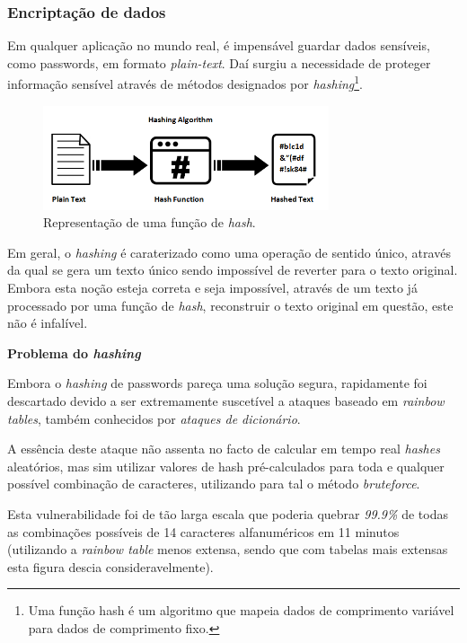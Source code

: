 \cleardoublepage
\subsubsection{Encriptação de dados}

Em qualquer aplicação no mundo real, é impensável guardar dados sensíveis, como passwords, em formato \emph{plain-text}. Daí surgiu a necessidade de proteger informação sensível através de métodos designados por \emph{hashing}\footnote{Uma função hash é um algoritmo que mapeia dados de comprimento variável para dados de comprimento fixo.}.\\

\begin{figure}[h]
    \centering
    \includegraphics[width=0.75\textwidth]{img/bcrypt/Hashing.png}
    \caption{Representação de uma função de \emph{hash}.}
\end{figure}

Em geral, o \emph{hashing} é caraterizado como uma operação de sentido único, através da qual se gera um texto único sendo impossível de reverter para o texto original.
Embora esta noção esteja correta e seja impossível, através de um texto já processado por uma função de \emph{hash}, reconstruir o texto original em questão, este não é infalível.

\vspace{0.5cm}
\large{\textbf{Problema do \emph{hashing}}}


Embora o \emph{hashing} de passwords pareça uma solução segura, rapidamente foi descartado devido a ser extremamente suscetível a ataques baseado em \emph{rainbow tables}, também conhecidos por \emph{ataques de dicionário}.

A essência deste ataque não assenta no facto de calcular em tempo real \emph{hashes} aleatórios, mas sim utilizar valores de hash pré-calculados para toda e qualquer possível combinação de caracteres, utilizando para tal o método \emph{bruteforce}. 

Esta vulnerabilidade foi de tão larga escala que poderia quebrar \emph{99.9\%} de todas as combinações possíveis de 14 caracteres alfanuméricos em 11 minutos (utilizando a \emph{rainbow table} menos extensa, sendo que com tabelas mais extensas esta figura descia consideravelmente).

